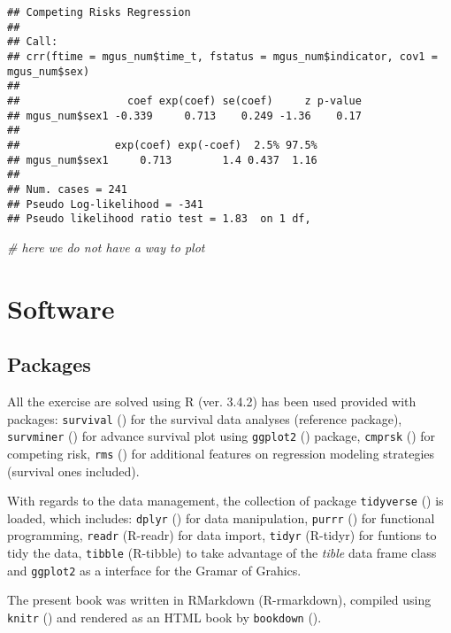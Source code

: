 \documentclass[]{book}
\newenvironment{Shaded}{\begin{snugshade}}{\end{snugshade}}
\newcommand{\CommentTok}[1]{\textcolor[rgb]{0.56,0.35,0.01}{\textit{{#1}}}}
\theoremstyle{definition}
\theoremstyle{definition}
\theoremstyle{definition}
\theoremstyle{remark}
\begin{document}
\begin{verbatim}
## Competing Risks Regression
## 
## Call:
## crr(ftime = mgus_num$time_t, fstatus = mgus_num$indicator, cov1 = mgus_num$sex)
## 
##                 coef exp(coef) se(coef)     z p-value
## mgus_num$sex1 -0.339     0.713    0.249 -1.36    0.17
## 
##               exp(coef) exp(-coef)  2.5% 97.5%
## mgus_num$sex1     0.713        1.4 0.437  1.16
## 
## Num. cases = 241
## Pseudo Log-likelihood = -341 
## Pseudo likelihood ratio test = 1.83  on 1 df,
\end{verbatim}

\begin{Shaded}
\begin{Highlighting}[]
                                             \CommentTok{# here we do not have a way to plot }
\end{Highlighting}
\end{Shaded}

\chapter*{Software}\label{software}

\section*{Packages}\label{packages}

All the exercise are solved using R (ver. 3.4.2) has been used provided
with packages: \texttt{survival} (\citet{R-survival}) for the survival
data analyses (reference package), \texttt{survminer}
(\citet{R-survminer}) for advance survival plot using \texttt{ggplot2}
(\citet{R-ggplot2}) package, \texttt{cmprsk} (\citet{R-cmprsk}) for
competing risk, \texttt{rms} (\citet{R-rms}) for additional features on
regression modeling strategies (survival ones included).

With regards to the data management, the collection of package
\texttt{tidyverse} (\citet{R-tidyverse}) is loaded, which includes:
\texttt{dplyr} (\citet{R-dplyr}) for data manipulation, \texttt{purrr}
(\citet{R-purrr}) for functional programming, \texttt{readr} (R-readr)
for data import, \texttt{tidyr} (R-tidyr) for funtions to tidy the data,
\texttt{tibble} (R-tibble) to take advantage of the \emph{tible} data
frame class and \texttt{ggplot2} as a interface for the Gramar of
Grahics.

The present book was written in RMarkdown (R-rmarkdown), compiled using
\texttt{knitr} (\citet{R-knitr}) and rendered as an HTML book by
\texttt{bookdown} (\citet{R-bookdown}).
\end{document}
